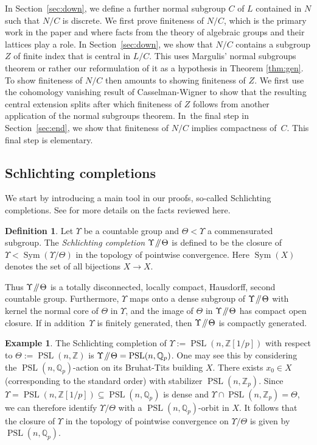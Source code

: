 \documentclass[11pt]{article}
\numberwithin{equation}{section}\providecommand{\llangle}{\langle\!\langle}\providecommand{\rrangle}{\rangle\!\rangle}\providecommand{\Asterisk}{\ast}
\newcommand{\Y}{\ensuremath{\Upsilon}}
\newcommand{\sslash}{\mathbin{\mkern-3mu /\mkern-5mu/ \mkern-3mu}}
\newcommand{\bbQ}{\ensuremath{\mathbb{Q}}}
\newcommand{\bbZ}{\ensuremath{\mathbb{Z}}}
\DeclareMathOperator{\PSL}{PSL}
\DeclareMathOperator{\Sym}{Sym}
\theoremstyle{definition}
\newtheorem{dfn}[thm]{Definition}
\newtheorem{ex}[thm]{Example}
\begin{document}
In Section~\ref{sec:down}, we define a further normal subgroup $C$ of $L$ contained in $N$ such that $N/C$ is discrete. We first prove finiteness of $N/C$, which is the primary work in the paper
and where facts from the theory of algebraic groups and their lattices play a role. In Section~\ref{sec:down}, we show that $N/C$ contains a subgroup $Z$ of finite index that is central in $L/C$.
This uses Margulis' normal subgroups theorem or rather our reformulation of it as a hypothesis in Theorem \ref{thm:gen}. To show finiteness of $N/C$ then amounts to showing finiteness of $Z$. We first use the cohomology vanishing result of Casselman-Wigner to show that the resulting central extension splits after which finiteness of $Z$ follows from another application of the normal subgroups theorem.
In~the final step in Section~\ref{sec:end}, we show that finiteness of $N/C$ implies compactness of~$C$. This final step is elementary.

\subsection{Schlichting completions}\label{sec:schlichting-def}
We start by introducing a main tool in our proofs, so-called Schlichting completions. See \cite[\S 3]{shalom-willis} for more details on the facts reviewed here.

\begin{dfn} Let $\Y$ be a countable group and $\Theta<\Y$ a commensurated subgroup. The \emph{Schlichting completion} $\Y\sslash\Theta$ is defined to be the closure of $\Y<\Sym(\Y/\Theta)$ in the topology of pointwise convergence. Here $\Sym(X)$ denotes the set of all bijections $X\to X$.\end{dfn}

Thus $\Y\sslash\Theta$ is a totally disconnected, locally compact, Hausdorff, second countable group. Furthermore, $\Y$ maps onto a dense subgroup of $\Y\sslash\Theta$ with kernel the normal core of $\Theta$ in $\Y$, and the image of $\Theta$ in $\Y\sslash\Theta$ has compact open closure. If in addition~$\Y$ is finitely generated, then $\Y\sslash\Theta$ is compactly generated.

\begin{ex}\label{ex:schlichting-arithmetic}
The Schlichting completion of $\Y:=\PSL(n,\bbZ[1/p])$ with respect to $\Theta:=\PSL(n,\bbZ)$ is $\Y\sslash\Theta=\PSL(n,\bbQ_p)$. One may see this by considering the $\PSL(n,\bbQ_p)$-action on its Bruhat-Tits building $X$. There exists $x_0\in X$ (corresponding to the standard order) with stabilizer $\PSL(n,\bbZ_p)$. Since $\Y=\PSL(n,\bbZ[1/p])\subseteq\PSL(n,\bbQ_p)$ is dense and $\Y\cap \PSL(n,\bbZ_p)=\Theta$, we can therefore identify $\Y/\Theta$ with a $\PSL(n,\bbQ_p)$-orbit in $X$. It follows that the closure of $\Y$ in the topology of pointwise convergence on $\Y/\Theta$ is given by $\PSL(n,\bbQ_p)$.
\end{ex}
\end{document}
